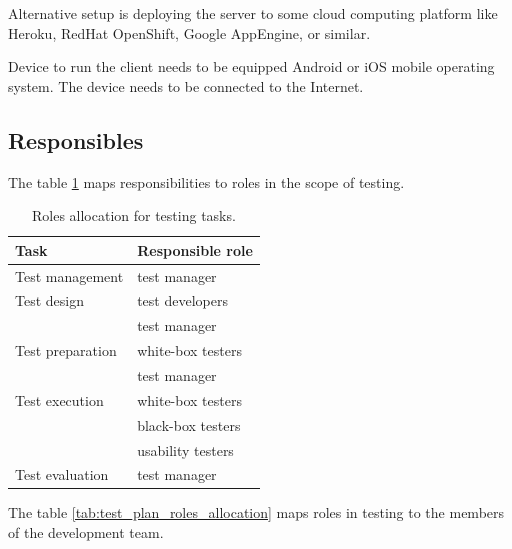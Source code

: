 \documentclass[11pt]{book}
\begin{document}
Alternative setup is deploying the server to some cloud computing platform like Heroku, RedHat OpenShift, Google AppEngine, or similar. 

Device to run the client needs to be equipped Android or iOS mobile operating system. The device needs to be connected to the Internet.

\subsection{Responsibles}

The table \ref{tab:test_plan_tasks_allocation} maps responsibilities to roles in the scope of testing.

\begin{table}[H]
    \centering
    \begin{tabular}{| l | l |}
        \hline
        Task                & Responsible role              \\ \hline

        Test management     & test manager                  \\ \hline
        
        Test design         & test developers               \\
                            & test manager                  \\ \hline
        
        Test preparation    & white-box testers             \\
                            & test manager                  \\ \hline
        
        Test execution      & white-box testers             \\
                            & black-box testers             \\
                            & usability testers             \\ \hline
        
        Test evaluation     & test manager                  \\ \hline
    \end{tabular}
    \label{tab:test_plan_tasks_allocation}
    \caption{Roles allocation for testing tasks.}
\end{table}

The table \ref{tab:test_plan_roles_allocation} maps roles in testing to the members of the development team.
\end{document}

